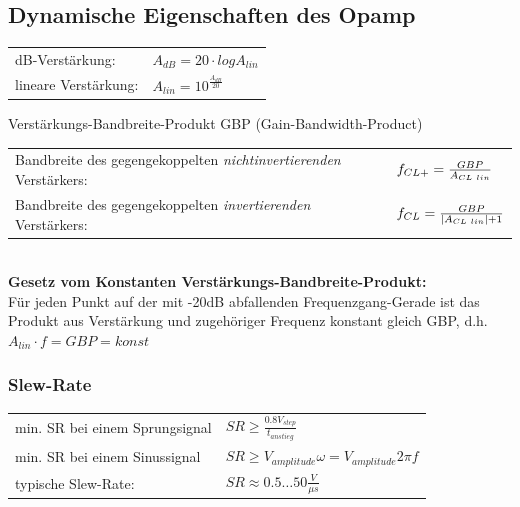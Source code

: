 	\subsection{Dynamische Eigenschaften des Opamp}
		\begin{tabular}{ll}
			dB-Verstärkung:&
			$A_{dB}=20 \cdot log A_{lin}$\\
			lineare Verstärkung:&
			$A_{lin}=10^{\frac{A_{dB}}{20}}$\\
		\end{tabular}
		Verstärkungs-Bandbreite-Produkt GBP (Gain-Bandwidth-Product)\\
		\begin{tabular}{ll}
			Bandbreite des gegengekoppelten {\it nichtinvertierenden} Verstärkers:&
			$f_{CL+}=\frac{GBP}{A_{CL \hspace{1mm}lin}}$\\
			Bandbreite des gegengekoppelten {\it invertierenden} Verstärkers: &
			$f_{CL}=\frac{GBP}{\left| A_{CL \hspace{1mm}lin}\right|+1}$\\
		\end{tabular}\\
		{\bf Gesetz vom Konstanten Verstärkungs-Bandbreite-Produkt:} \\
		Für jeden Punkt auf der mit -20dB abfallenden Frequenzgang-Gerade ist das
		Produkt aus Verstärkung und zugehöriger Frequenz konstant gleich GBP, d.h. $A_{lin}\cdot f=GBP=konst$\\
		\subsubsection{Slew-Rate}
			\begin{tabular}{ll}
				min. SR bei einem Sprungsignal &
				$SR\geq\frac{0.8V_{step}}{t_{anstieg}}$\\ 
				min. SR bei einem Sinussignal & 
				$SR\geq V_{amplitude}\omega=V_{amplitude}2\pi f$\\
				typische Slew-Rate: & $SR \approx 0.5 \dots 50 \frac{V}{\mu s}$
			\end{tabular}
			
